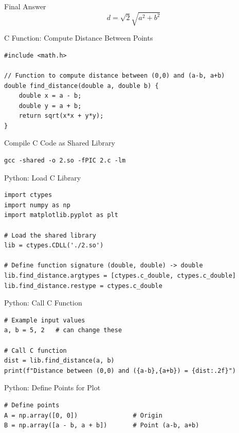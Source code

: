 \documentclass{beamer}
\begin{document}
\begin{frame}{Final Answer}
\[
\boxed{d = \sqrt{2}\sqrt{a^2+b^2}}
\]
\end{frame}

\begin{frame}[fragile]{C Function: Compute Distance Between Points}
\begin{verbatim}
#include <math.h>

// Function to compute distance between (0,0) and (a-b, a+b)
double find_distance(double a, double b) {
    double x = a - b;
    double y = a + b;
    return sqrt(x*x + y*y);
}
\end{verbatim}
\end{frame}

\begin{frame}[fragile]{Compile C Code as Shared Library}
\begin{verbatim}
gcc -shared -o 2.so -fPIC 2.c -lm
\end{verbatim}
\end{frame}

\begin{frame}[fragile]{Python: Load C Library}
\begin{verbatim}
import ctypes
import numpy as np
import matplotlib.pyplot as plt

# Load the shared library
lib = ctypes.CDLL('./2.so')

# Define function signature (double, double) -> double
lib.find_distance.argtypes = [ctypes.c_double, ctypes.c_double]
lib.find_distance.restype = ctypes.c_double
\end{verbatim}
\end{frame}

\begin{frame}[fragile]{Python: Call C Function}
\begin{verbatim}
# Example input values
a, b = 5, 2   # can change these

# Call C function
dist = lib.find_distance(a, b)
print(f"Distance between (0,0) and ({a-b},{a+b}) = {dist:.2f}")
\end{verbatim}
\end{frame}

\begin{frame}[fragile]{Python: Define Points for Plot}
\begin{verbatim}
# Define points
A = np.array([0, 0])               # Origin
B = np.array([a - b, a + b])       # Point (a-b, a+b)
\end{verbatim}
\end{frame}
\end{document}
